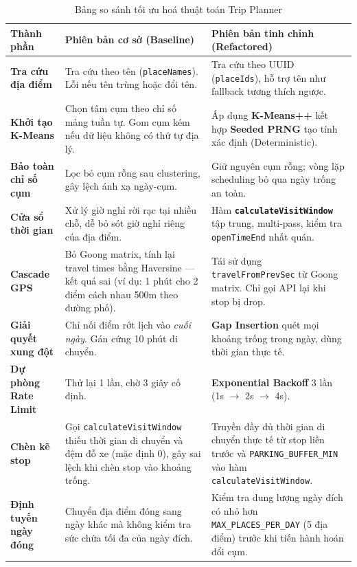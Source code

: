 \documentclass[12pt,a4paper]{article}
\begin{document}
\begin{table}[htbp]
\centering
\caption{Bảng so sánh tối ưu hoá thuật toán Trip Planner}
\label{tab:algorithm_optimization}
\renewcommand{\arraystretch}{1.4}
\begin{tabular}{@{} p{} p{} p{} @{}}
\toprule
\textbf{Thành phần} & \textbf{Phiên bản cơ sở (Baseline)} & \textbf{Phiên bản tinh chỉnh (Refactored)} \\
\midrule
\textbf{Tra cứu địa điểm} & Tra cứu theo tên (\texttt{placeNames}). Lỗi nếu tên trùng hoặc đổi tên. & Tra cứu theo UUID (\texttt{placeIds}), hỗ trợ tên như fallback tương thích ngược. \\
\addlinespace
\textbf{Khởi tạo K-Means} & Chọn tâm cụm theo chỉ số mảng tuần tự. Gom cụm kém nếu dữ liệu không có thứ tự địa lý. & Áp dụng \textbf{K-Means++} kết hợp \textbf{Seeded PRNG} tạo tính xác định (Deterministic). \\
\addlinespace
\textbf{Bảo toàn chỉ số cụm} & Lọc bỏ cụm rỗng sau clustering, gây lệch ánh xạ ngày-cụm. & Giữ nguyên cụm rỗng; vòng lặp scheduling bỏ qua ngày trống an toàn. \\
\addlinespace
\textbf{Cửa sổ thời gian} & Xử lý giờ nghỉ rời rạc tại nhiều chỗ, dễ bỏ sót giờ nghỉ riêng của địa điểm. & Hàm \textbf{\texttt{calculateVisitWindow}} tập trung, multi-pass, kiểm tra \texttt{openTimeEnd} nhất quán. \\
\addlinespace
\textbf{Cascade GPS} & Bỏ Goong matrix, tính lại travel times bằng Haversine --- kết quả sai (ví dụ: 1 phút cho 2 điểm cách nhau 500m theo đường phố). & Tái sử dụng \texttt{travelFromPrevSec} từ Goong matrix. Chỉ gọi API lại khi stop bị drop. \\
\addlinespace
\textbf{Giải quyết xung đột} & Chỉ nối điểm rớt lịch vào \textit{cuối ngày}. Gán cứng 10 phút di chuyển. & \textbf{Gap Insertion} quét mọi khoảng trống trong ngày, dùng thời gian thực tế. \\
\addlinespace
\textbf{Dự phòng Rate Limit} & Thử lại 1 lần, chờ 3 giây cố định. & \textbf{Exponential Backoff} 3 lần (1s $\to$ 2s $\to$ 4s). \\
\addlinespace
\textbf{Chèn kẽ stop} & Gọi \texttt{calculateVisitWindow} thiếu thời gian di chuyển và đệm đỗ xe (mặc định 0), gây sai lệch khi chèn stop vào khoảng trống. & Truyền đầy đủ thời gian di chuyển thực tế từ stop liền trước và \texttt{PARKING\_BUFFER\_MIN} vào hàm \texttt{calculateVisitWindow}. \\
\addlinespace
\textbf{Định tuyến ngày đóng} & Chuyển địa điểm đóng sang ngày khác mà không kiểm tra sức chứa tối đa của ngày đích. & Kiểm tra dung lượng ngày đích có nhỏ hơn \texttt{MAX\_PLACES\_PER\_DAY} (5 địa điểm) trước khi tiến hành hoán đổi cụm. \\
\bottomrule
\end{tabular}
\end{table}
\end{document}
